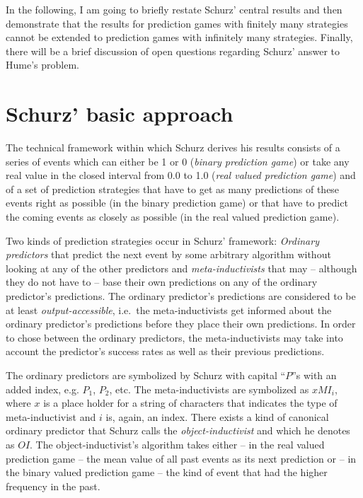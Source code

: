 \documentclass[12pt, a4paper]{article}
\numberwithin{equation}{section}
\begin{document}
In the following, I am going to briefly restate Schurz' central results and
then demonstrate that the results for prediction games with finitely many
strategies cannot be extended to prediction games with infinitely many
strategies. Finally, there will be a brief discussion of open questions
regarding Schurz' answer to Hume's problem.


\section{Schurz' basic approach}

The technical framework within which Schurz derives his results consists of 
a series of events which can either be 1 or 0 ({\em binary prediction game}) or
take any real value in the closed interval from 0.0 to 1.0 ({\em real valued
prediction game}) and of a set of prediction strategies that have to get as many
predictions of these events right as possible (in the binary prediction game) or that
have to predict the coming events as closely as possible (in the real valued
prediction game).

Two kinds of prediction strategies occur in Schurz' framework: {\em Ordinary
predictors} that predict the next event by some arbitrary algorithm without
looking at any of the other predictors and {\em meta-inductivists} that may --
although they do not have to -- base their own predictions on any of the ordinary
predictor's predictions. The ordinary predictor's predictions are considered to
be at least {\em output-accessible}, i.e.~the meta-inductivists get informed
about the ordinary predictor's predictions before they place their own
predictions. In order to chose between the ordinary predictors, the
meta-inductivists may take into account the predictor's success rates as well as
their previous predictions. 

The ordinary predictors are symbolized by Schurz with capital ``$P$''s with an
added index, e.g. $P_1$, $P_2$, etc. The meta-inductivists are symbolized as $xMI_i$,
where $x$ is a place holder for a string of characters that indicates the type of
meta-inductivist and $i$ is, again, an index. There exists a kind of canonical
ordinary predictor that Schurz calls the {\em object-inductivist} and which he
denotes as $OI$. The object-inductivist's algorithm takes either -- in the
real valued prediction game -- the mean value of all past events as its next prediction
or -- in the binary valued prediction game -- the kind of event that had the higher
frequency in the past.
\end{document}
